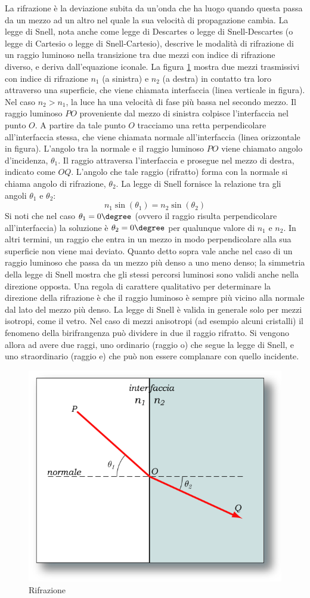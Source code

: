 La rifrazione è la deviazione subita da un'onda che ha luogo quando questa
passa da un mezzo ad un altro  nel quale la sua velocità di propagazione
cambia. La legge di Snell, nota anche come legge di Descartes o legge di
Snell-Descartes (o legge di Cartesio o legge di Snell-Cartesio), descrive le
modalità di rifrazione di un raggio luminoso nella transizione tra due mezzi
con indice di rifrazione diverso, e deriva dall'equazione iconale. La figura
\ref{fig:snell} mostra due mezzi trasmissivi con indice di rifrazione $n_1$ (a
sinistra) e $n_2$ (a destra) in contatto tra loro attraverso una superficie,
che viene chiamata interfaccia (linea verticale in figura). Nel caso $n_2 >
n_1$, la luce ha una velocità di fase più bassa nel secondo mezzo. Il raggio
luminoso $PO$ proveniente dal mezzo di sinistra colpisce l'interfaccia nel
punto $O$. A partire da tale punto $O$ tracciamo una retta perpendicolare
all'interfaccia stessa, che viene chiamata normale all'interfaccia (linea
orizzontale in figura). L'angolo tra la normale e il raggio luminoso $PO$
viene chiamato angolo d'incidenza, $\theta_1$. Il raggio attraversa
l'interfaccia e prosegue nel mezzo di destra, indicato come $OQ$. L'angolo che
tale raggio (rifratto) forma con la normale si chiama angolo di rifrazione,
$\theta_2$. La legge di Snell fornisce la relazione tra gli angoli $\theta_1$
e $\theta_2$: 
\[n_1 \sin(\theta_1)=n_2 \sin(\theta_2)\]
 Si noti che nel caso
$\theta_1 = 0\degree$ (ovvero il raggio risulta perpendicolare
all'interfaccia) la soluzione è $\theta_2 = 0\degree$ per qualunque valore di
$n_1$ e $n_2$. In altri termini, un raggio che entra in un mezzo in modo
perpendicolare alla sua superficie non viene mai deviato. Quanto detto sopra
vale anche nel caso di un raggio luminoso che passa da un mezzo più denso a
uno meno denso; la simmetria della legge di Snell mostra che gli stessi
percorsi luminosi sono validi anche nella direzione opposta. Una regola di
carattere qualitativo per determinare la direzione della rifrazione è che il
raggio luminoso è sempre più vicino alla normale dal lato del mezzo più denso.
La legge di Snell è valida in generale solo per mezzi isotropi, come il vetro.
Nel caso di mezzi anisotropi (ad esempio alcuni cristalli) il fenomeno della
birifrangenza può dividere in due il raggio rifratto. Si vengono allora ad
avere due raggi, uno ordinario (raggio o) che segue la legge di Snell, e uno
straordinario (raggio e) che può non essere complanare con quello incidente.

\begin{figure}
\centering
\includegraphics[width=.5\textwidth]{img/Legge_di_Snell.png}
\caption{Rifrazione}\label{fig:snell}
\end{figure}

